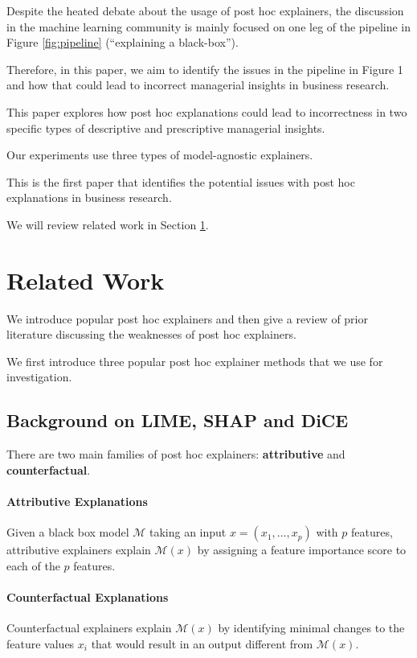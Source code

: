 \documentclass[mnsc,blindrev]{informs3}
\begin{document}
Despite the heated debate about the usage of post hoc explainers, the discussion in the machine learning community is mainly focused on one leg of the pipeline in Figure \ref{fig:pipeline}  (``explaining a black-box'').

Therefore, in this paper, we aim to identify the issues in the pipeline in Figure 1 and how that could lead to incorrect managerial insights in business research. 


This paper explores how post hoc explanations could lead to incorrectness in two specific types of descriptive and prescriptive managerial insights. 

Our experiments use three types of model-agnostic explainers.



   This is the first paper that identifies the potential issues with post hoc explanations in business research.


    We will review related work in Section \ref{sec:related_work}. 
    
\section{Related Work}
    \label{sec:related_work}
    We introduce popular post hoc explainers and then give a review of prior literature discussing the weaknesses of post hoc explainers. 

    We first introduce three popular post hoc explainer methods that we use for investigation. 

    \subsection{Background on LIME, SHAP and DiCE}
    There are two main families of post hoc explainers: \textbf{attributive} and \textbf{counterfactual}. 
    
    \paragraph{Attributive Explanations} Given a black box model $\mathcal{M}$ taking an input $x=(x_1,...,x_p)$ with $p$ features, attributive explainers explain $\mathcal{M}(x)$ by assigning a feature importance score to each of the $p$ features. 


 \paragraph{Counterfactual Explanations}   Counterfactual explainers explain $\mathcal{M}(x)$ by identifying minimal changes to the feature values $x_i$ that would result in an output different from $\mathcal{M}(x)$. 
 
\end{document}
